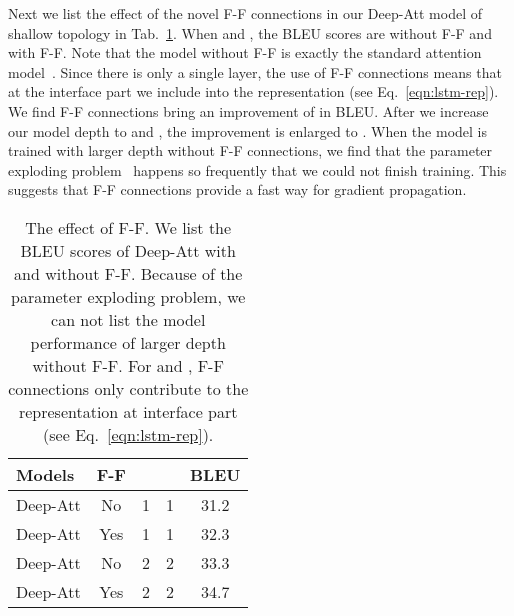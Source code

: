 \documentclass[11pt,letterpaper]{article}
\begin{document}
Next we  list the effect of the novel F-F connections in our Deep-Att model of shallow topology in Tab.~\ref{tab:Results-BLEU-SingleCheck}.
When  and , the BLEU scores are  without F-F and  with F-F. Note that the model without F-F is exactly the standard
attention model~\cite{Bahdanau-Bengio-ICLR2015}. Since there is only a single layer, the use of F-F \mbox{connections} means that at the
interface part we include  into the representation (see Eq.~\ref{eqn:lstm-rep}).  We find F-F connections bring an improvement of 
in BLEU. After we increase our model depth to  and , the improvement is enlarged to .  When the model is trained with
larger depth without F-F connections, we find that the parameter exploding problem~\cite{Bengio-Frasconi-Trans1994} happens so frequently that
we could not finish training. This suggests that F-F connections provide a fast way for gradient propagation.
\begin{table}[!ht]
\footnotesize
\begin{center}
\begin{tabular}{|l|c|c|c|c|}
\hline
  Models & F-F & &  & BLEU \\
  \hline
  Deep-Att  & No  & 1  & 1 & 31.2 \\
  Deep-Att  & Yes & 1  & 1 & 32.3 \\
  \hline
  Deep-Att  & No  & 2  & 2 & 33.3 \\
  Deep-Att  & Yes & 2  & 2 & 34.7 \\
  \hline
\end{tabular}
\end{center}
\caption{\label{tab:Results-BLEU-SingleCheck} The effect of F-F. We list the BLEU scores  of Deep-Att with and without F-F. Because of the
parameter exploding problem, we can not list the model performance of larger depth without F-F. For  and , F-F connections only
contribute to the representation at interface part (see Eq.~\ref{eqn:lstm-rep}).}
\end{table}
\end{document}
